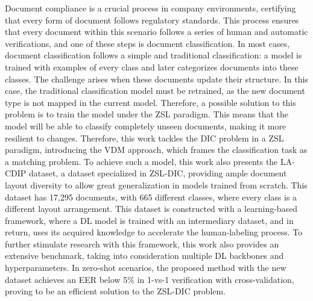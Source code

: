 Document compliance is a crucial process in company environments, certifying that every form of document follows regulatory standards. This process ensures that every document within this scenario follows a series of human and automatic verifications, and one of these steps is document classification. In most cases, document classification follows a simple and traditional classification: a model is trained with examples of every class and later categorizes documents into these classes.
The challenge arises when these documents update their structure. In this case, the traditional classification model must be retrained, as the new document type is not mapped in the current model. Therefore, a possible solution to this problem is to train the model under the \gls{ZSL} paradigm. This means that the model will be able to classify completely unseen documents, making it more resilient to changes. Therefore, this work tackles the \gls{DIC} problem in a \gls{ZSL} paradigm, introducing the \gls{VDM} approach, which frames the classification task as a matching problem. To achieve such a model, this work also presents the \gls{LA-CDIP} dataset, a dataset specialized in \gls{ZSL}-\gls{DIC}, providing ample document layout diversity to allow great generalization in models trained from scratch. This dataset has 17,295 documents, with 665 different classes, where every class is a different layout arrangement.
This dataset is constructed with a learning-based framework, where a \gls{DL} model is trained with an intermediary dataset, and in return, uses its acquired knowledge to accelerate the human-labeling process.
To further stimulate research with this framework, this work also provides an extensive benchmark, taking into consideration multiple \gls{DL} backbones and hyperparameters. In zero-shot scenarios, the proposed method with the new dataset achieves an \acrfull{EER} below 5\% in 1-vs-1 verification with cross-validation, proving to be an efficient solution to the \gls{ZSL}-\gls{DIC} problem.

